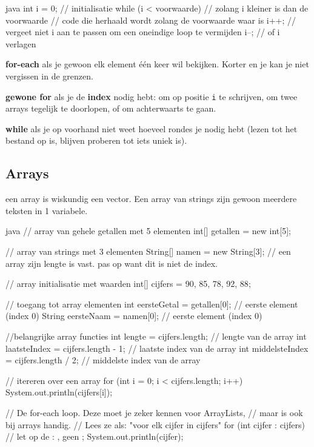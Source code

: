 \documentclass[a4paper,11pt]{article}
\begin{document}
\begin{codeblock}{java}
    int i = 0; // initialisatie
    while (i < voorwaarde) // zolang i kleiner is dan de voorwaarde
        {
            // code die herhaald wordt zolang de voorwaarde waar is
            i++; // vergeet niet i aan te passen om een oneindige loop te vermijden
            i--; // of i verlagen
        }
\end{codeblock}


\begin{conceptbox}
    \textbf{for-each} als je gewoon elk element \'e\'en keer wil bekijken. Korter en
    je kan je niet vergissen in de grenzen.

    \medskip
    \textbf{gewone for} als je de \textbf{index} nodig hebt: om op positie
    \texttt{i} te schrijven, om twee arrays tegelijk te doorlopen, of om achterwaarts
    te gaan.

    \medskip
    \textbf{while} als je op voorhand niet weet hoeveel rondes je nodig hebt (lezen
    tot het bestand op is, blijven proberen tot iets uniek is).
\end{conceptbox}

\subsection{Arrays}

een array is wiskundig een vector.
Een array van strings zijn gewoon meerdere teksten in 1 variabele.

\begin{codeblock}[array]{java}
    // array van gehele getallen met 5 elementen
    int[] getallen = new int[5];

    // array van strings met 3 elementen
    String[] namen = new String[3]; // een array zijn lengte is vast. pas op want dit is niet de index.

    // array initialisatie met waarden
    int[] cijfers = {90, 85, 78, 92, 88};

    // toegang tot array elementen
    int eersteGetal = getallen[0]; // eerste element (index 0)
    String eersteNaam = namen[0]; // eerste element (index 0)

    //belangrijke array functies
    int lengte = cijfers.length; // lengte van de array
    int laatsteIndex = cijfers.length - 1; // laatste index van de array
    int middelsteIndex = cijfers.length / 2; // middelste index van de array

    // itereren over een array
    for (int i = 0; i < cijfers.length; i++)
    {
            System.out.println(cijfers[i]);
        }

    // De for-each loop. Deze moet je zeker kennen voor ArrayLists,
    // maar is ook bij arrays handig.
    // Lees ze als: "voor elk cijfer in cijfers"
    for (int cijfer : cijfers) // let op de : , geen ;
    {
    System.out.println(cijfer);
    }
\end{codeblock}
\end{document}
